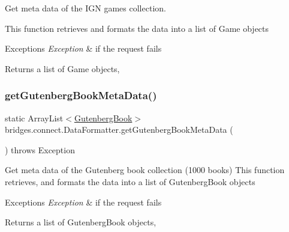 Get meta data of the I\+GN games collection.

This function retrieves and formats the data into a list of Game objects


\begin{DoxyExceptions}{Exceptions}
{\em Exception} & if the request fails\\
\hline
\end{DoxyExceptions}
\begin{DoxyReturn}{Returns}
a list of Game objects, 
\end{DoxyReturn}
\mbox{\label{classbridges_1_1connect_1_1_data_formatter_a4bd21bd830238db40b511474afc77b61}} 
\subsubsection{\texorpdfstring{get\+Gutenberg\+Book\+Meta\+Data()}{getGutenbergBookMetaData()}}
{\footnotesize\ttfamily static Array\+List$<$\mbox{\hyperlink{classbridges_1_1data__src__dependent_1_1_gutenberg_book}{Gutenberg\+Book}}$>$ bridges.\+connect.\+Data\+Formatter.\+get\+Gutenberg\+Book\+Meta\+Data (\begin{DoxyParamCaption}{ }\end{DoxyParamCaption}) throws Exception\hspace{0.3cm}{\ttfamily [static]}}

Get meta data of the Gutenberg book collection (1000 books) This function retrieves, and formats the data into a list of Gutenberg\+Book objects


\begin{DoxyExceptions}{Exceptions}
{\em Exception} & if the request fails\\
\hline
\end{DoxyExceptions}
\begin{DoxyReturn}{Returns}
a list of Gutenberg\+Book objects, 
\end{DoxyReturn}
\mbox{\label{classbridges_1_1connect_1_1_data_formatter_a4abc8f8b0970d6c07c680ac485e299c7}} 
